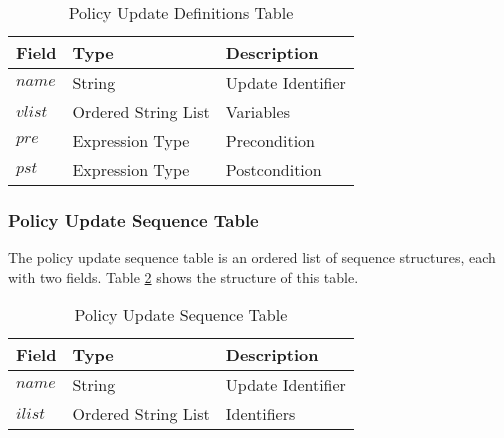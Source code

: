 \documentclass[11pt]{report}
\begin{document}
            \begin{table}[tbhp]
              \begin{center}
                \begin{tabular}[t]{|l|l|l|}
                  \hline
                  \textbf{Field} & \textbf{Type}       & \textbf{Description} \\
                  \hline
                  $name$         & String              & Update Identifier \\
                  \hline
                  $vlist$        & Ordered String List & Variables \\
                  \hline
                  $pre$          & Expression Type     & Precondition \\
                  \hline
                  $pst$          & Expression Type     & Postcondition \\
                  \hline
                \end{tabular}
              \end{center}
              \caption{Policy Update Definitions Table}
              \label{tabl-polup-pdtab}
            \end{table}

        \subsubsection{Policy Update Sequence Table}

          The policy update sequence table is an ordered list of sequence
          structures, each with two fields. Table \ref{tabl-polup-pstab}
          shows the structure of this table.

          \begin{table}[tbhp]
            \begin{center}
              \begin{tabular}[t]{|l|l|l|}
                \hline
                \textbf{Field} & \textbf{Type}       & \textbf{Description} \\
                \hline
                $name$         & String              & Update Identifier \\
                \hline
                $ilist$        & Ordered String List & Identifiers \\
                \hline
              \end{tabular}
            \end{center}
            \caption{Policy Update Sequence Table}
            \label{tabl-polup-pstab}
          \end{table}
\end{document}
